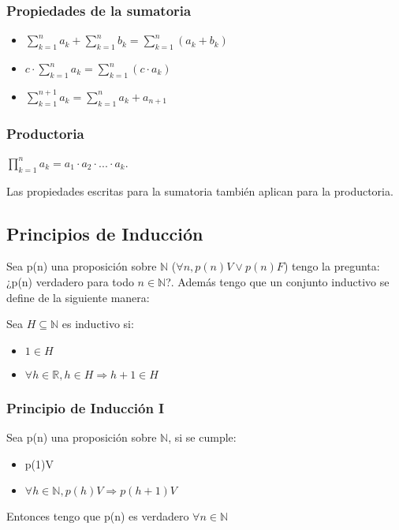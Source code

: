 \documentclass{article}
\begin{document}
\subsubsection{Propiedades de la sumatoria}
\begin{itemize}
    \item \begin{math}
        \sum_{k=1}^n a_k + \sum_{k=1}^n b_k = \sum_{k=1}^n (a_k + b_k)
    \end{math}
    \item \begin{math}
        c \cdot \sum_{k=1}^n a_k = \sum_{k=1}^n (c \cdot a_k)
    \end{math}
    \item \begin{math}
        \sum_{k=1}^{n+1} a_k = \sum_{k=1}^n a_k + a_{n+1}
    \end{math}
\end{itemize}

\subsubsection{Productoria}
\begin{math}
    \prod_{k=1}^n a_k = a_1 \cdot a_2 \cdot ... \cdot a_k
\end{math}.

Las propiedades escritas para la sumatoria también aplican para la productoria.

\subsection{Principios de Inducción}
Sea p(n) una proposición sobre $\mathbb{N}$ ($\forall n, p(n)V \lor p(n)F$) tengo la pregunta: ¿p(n) verdadero para todo $n \in \mathbb{N}$?. Además tengo que un conjunto inductivo se define de la siguiente manera:

Sea $H \subseteq \mathbb{N}$ es inductivo si: \begin{itemize}
    \item $1 \in H$
    \item $\forall h \in \mathbb{R}, h \in H \Rightarrow h + 1 \in H$
\end{itemize}

\subsubsection{Principio de Inducción I}
Sea p(n) una proposición sobre $\mathbb{N}$, si se cumple: \begin{itemize}
    \item p(1)V
    \item $\forall h \in \mathbb{N}, p(h)V \Rightarrow p(h+1)V$
\end{itemize}
Entonces tengo que p(n) es verdadero $\forall n \in \mathbb{N}$
\end{document}
